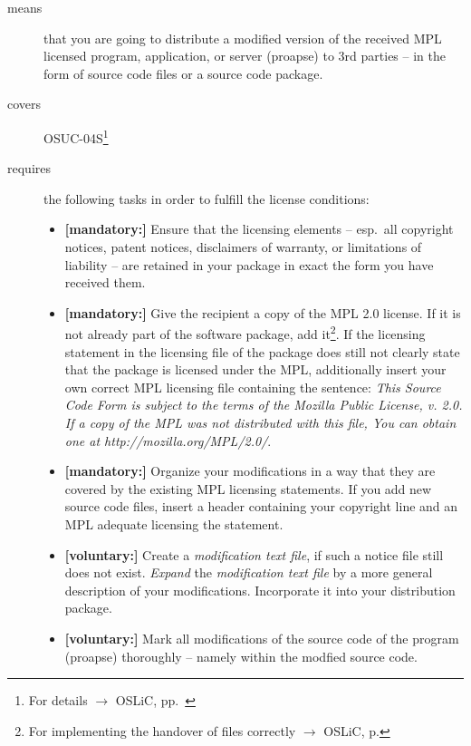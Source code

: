 \begin{description}
\item[means] that you are going to distribute a modified version of the received
MPL licensed program, application, or server (proapse) to 3rd parties -- in the
form of source code files or a source code package.
\item[covers] OSUC-04S\footnote{For details $\rightarrow$ OSLiC, pp.\
\pageref{OSUC-04S-DEF}}
\item[requires] the following tasks in order to fulfill the license conditions:
\begin{itemize}
  
  \item \textbf{[mandatory:]} Ensure that the licensing elements -- esp.\ all
  copyright notices, patent notices, disclaimers of warranty, or limitations of
  liability -- are retained in your package in exact the form you have received
  them.

  \item \textbf{[mandatory:]} Give the recipient a copy of the MPL 2.0 license.
  If it is not already part of the software package, add it\footnote{For
  implementing the handover of files correctly $\rightarrow$ OSLiC, p.
  \pageref{DistributingFilesHint}}. If the licensing statement in the licensing
  file of the package does still not clearly state that the package is licensed
  under the MPL, additionally insert your own correct MPL licensing file
  containing the sentence: \emph{This Source Code Form is subject to the terms
  of the Mozilla Public License, v. 2.0. If a copy of the MPL was not
  distributed with this file, You can obtain one at
  http://mozilla.org/MPL/2.0/}.  
  
  \item \textbf{[mandatory:]} Organize your modifications in a way that they are
  covered by the existing MPL licensing statements. If you add new source code
  files, insert a header containing your copyright line and an MPL adequate
  licensing the statement.
  
  \item \textbf{[voluntary:]} Create a \emph{modification text file}, if such a
  notice file still does not exist. \emph{Expand} the \emph{modification text
  file} by a more general description of your modifications. Incorporate it into
  your distribution package.
  
  \item \textbf{[voluntary:]} Mark all modifications of the source code of the
  program (proapse) thoroughly -- namely within the modfied source code.


\end{itemize}
\end{description}
